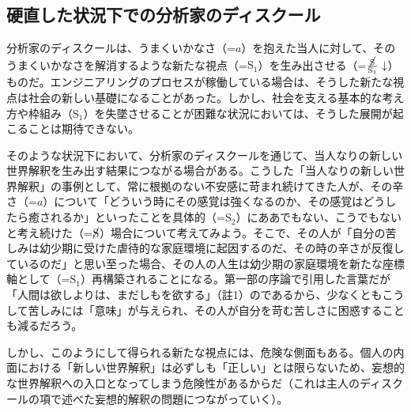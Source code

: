 \subsection{硬直した状況下での分析家のディスクール}\label{ux786cux76f4ux3057ux305fux72b6ux6cc1ux4e0bux3067ux306eux5206ux6790ux5bb6ux306eux30c7ux30a3ux30b9ux30afux30fcux30eb}

\mbox{分析家のディスクール}は、うまくいかなさ（=\(a\)）を抱えた当人に対して、そのうまくいかなさを解消するような新たな視点（=\(\textrm{S}_1\)）を生み出させる（=\(\frac{\cancel{\textrm{S}}}{\textrm{S}_1}\downarrow\)）ものだ。エンジニアリングのプロセスが稼働している場合は、そうした新たな視点は社会の新しい基礎になることがあった。しかし、社会を支える基本的な考え方や枠組み（\(\textrm{S}_1\)）を失墜させることが困難な状況においては、そうした展開が起こることは期待できない。

そのような状況下において、\mbox{分析家のディスクール}を通じて、当人なりの新しい世界解釈を生み出す結果につながる場合がある。こうした「当人なりの新しい世界解釈」の事例として、常に根拠のない不安感に苛まれ続けてきた人が、その辛さ（=\(a\)）について「どういう時にその感覚は強くなるのか、その感覚はどうしたら癒されるか」といったことを具体的（=\(\textrm{S}_2\)）にああでもない、こうでもないと考え続けた（=\(\cancel{\textrm{S}}\)）場合について考えてみよう。そこで、その人が「自分の苦しみは幼少期に受けた虐待的な家庭環境に起因するのだ、その時の辛さが反復しているのだ」と思い至った場合、その人の人生は幼少期の家庭環境を新たな座標軸として（=\(\textrm{S}_1\)）再構築されることになる。第一部の序論で引用した言葉だが「人間は欲しよりは、まだしもを欲する」（註1）のであるから、少なくともこうして苦しみには「意味」が与えられ、その人が自分を苛む苦しさに困惑することも減るだろう。

しかし、このようにして得られる新たな視点には、危険な側面もある。個人の内面における「新しい世界解釈」は必ずしも「正しい」とは限らないため、妄想的な世界解釈への入口となってしまう危険性があるからだ（これは\mbox{主人のディスクール}の項で述べた妄想的解釈の問題につながっていく）。

